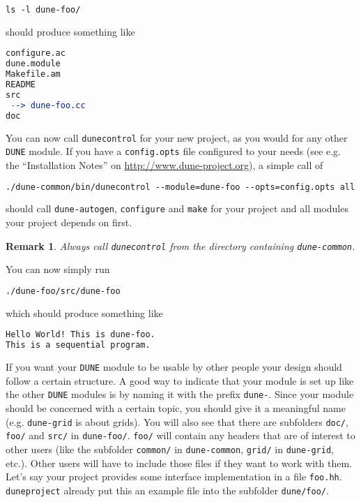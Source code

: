\documentclass[11pt,a4paper,headinclude,footinclude,DIV16,normalheadings]{scrartcl}
\newtheorem{remark}{Remark}[section]
\newcommand{\dune}{\texttt{DUNE}\xspace}
\newcommand{\autogen}{\texttt{dune-autogen}\xspace}
\newcommand{\configure}{\texttt{configure}\xspace}
\newcommand{\dunecommon}{\texttt{dune-common}\xspace}
\newcommand{\dunegrid}{\texttt{dune-grid}\xspace}
\newcommand{\dunecontrol}{\texttt{dunecontrol}\xspace}
\newcommand{\duneproject}{\texttt{duneproject}\xspace}
\newcommand{\make}{\texttt{make}\xspace}
\begin{document}
\begin{lstlisting}[language=make]
ls -l dune-foo/
\end{lstlisting}
should produce something like

\begin{lstlisting}[language=make]
configure.ac
dune.module
Makefile.am
README
src
 --> dune-foo.cc
doc
\end{lstlisting}

You can now call \dunecontrol for your new project, as you would for any other \dune module. If you have a \texttt{config.opts}\xspace
file configured to your needs (see e.g. the ``Installation Notes'' on
\url{http://www.dune-project.org}), a simple call of

\begin{lstlisting}[language=make]
./dune-common/bin/dunecontrol --module=dune-foo --opts=config.opts all
\end{lstlisting}
should call \autogen, \configure and \make for your
project and all modules your project depends on first.

\begin{remark}
Always call \dunecontrol from the directory containing \dunecommon.
\end{remark}

You can now  simply run

\begin{lstlisting}[language=make]
./dune-foo/src/dune-foo
\end{lstlisting}
which should produce something like

\begin{lstlisting}[language=make]
Hello World! This is dune-foo.
This is a sequential program.
\end{lstlisting}

If you want your \dune module to be usable by other people your
design should follow a certain structure. A good way to indicate that
your module is set up like the other \dune modules is by naming it
with the prefix \texttt{dune-}\xspace.  Since your module should be
concerned with a certain topic, you should give it a meaningful name
(e.g. \dunegrid is about grids).  You will also see that there are
subfolders \texttt{doc/}\xspace, \texttt{foo/}\xspace and
\texttt{src/}\xspace in \texttt{dune-foo/}\xspace.
\texttt{foo/}\xspace will contain any headers that are of interest to
other users (like the subfolder \texttt{common/}\xspace in
\dunecommon, \texttt{grid/}\xspace in \dunegrid, etc.). Other users
will have to include those files if they want to work with them. Let's
say your project provides some interface implementation in a file
\texttt{foo.hh}\xspace. \duneproject already put this an example file
into the subfolder \texttt{dune/foo/}.
\end{document}
